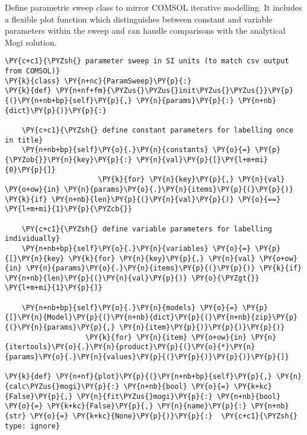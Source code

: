 Define parametric sweep class to mirror COMSOL iterative modelling. It
includes a flexible plot function which distinguishes between constant
and variable parameters within the sweep and can handle comparisons with
the analytical Mogi solution.

\begin{tcolorbox}[breakable, size=fbox, boxrule=1pt, pad at break*=1mm,colback=cellbackground, colframe=cellborder]
\begin{Verbatim}[commandchars=\\\{\}]
\PY{c+c1}{\PYZsh{} parameter sweep in SI units (to match csv output from COMSOL)}
\PY{k}{class} \PY{n+nc}{ParamSweep}\PY{p}{:}
\PY{k}{def} \PY{n+nf+fm}{\PYZus{}\PYZus{}init\PYZus{}\PYZus{}}\PY{p}{(}\PY{n+nb+bp}{self}\PY{p}{,} \PY{n}{params}\PY{p}{:} \PY{n+nb}{dict}\PY{p}{)}\PY{p}{:}

    \PY{c+c1}{\PYZsh{} define constant parameters for labelling once in title}
    \PY{n+nb+bp}{self}\PY{o}{.}\PY{n}{constants} \PY{o}{=} \PY{p}{\PYZob{}}\PY{n}{key}\PY{p}{:} \PY{n}{val}\PY{p}{[}\PY{l+m+mi}{0}\PY{p}{]}
                      \PY{k}{for} \PY{n}{key}\PY{p}{,} \PY{n}{val} \PY{o+ow}{in} \PY{n}{params}\PY{o}{.}\PY{n}{items}\PY{p}{(}\PY{p}{)} \PY{k}{if} \PY{n+nb}{len}\PY{p}{(}\PY{n}{val}\PY{p}{)} \PY{o}{==} \PY{l+m+mi}{1}\PY{p}{\PYZcb{}}

    \PY{c+c1}{\PYZsh{} define variable parameters for labelling individually}
    \PY{n+nb+bp}{self}\PY{o}{.}\PY{n}{variables} \PY{o}{=} \PY{p}{[}\PY{n}{key} \PY{k}{for} \PY{n}{key}\PY{p}{,} \PY{n}{val} \PY{o+ow}{in} \PY{n}{params}\PY{o}{.}\PY{n}{items}\PY{p}{(}\PY{p}{)} \PY{k}{if} \PY{n+nb}{len}\PY{p}{(}\PY{n}{val}\PY{p}{)} \PY{o}{\PYZgt{}} \PY{l+m+mi}{1}\PY{p}{]}

    \PY{n+nb+bp}{self}\PY{o}{.}\PY{n}{models} \PY{o}{=} \PY{p}{[}\PY{n}{Model}\PY{p}{(}\PY{n+nb}{dict}\PY{p}{(}\PY{n+nb}{zip}\PY{p}{(}\PY{n}{params}\PY{p}{,} \PY{n}{item}\PY{p}{)}\PY{p}{)}\PY{p}{)}
                   \PY{k}{for} \PY{n}{item} \PY{o+ow}{in} \PY{n}{itertools}\PY{o}{.}\PY{n}{product}\PY{p}{(}\PY{o}{*}\PY{n}{params}\PY{o}{.}\PY{n}{values}\PY{p}{(}\PY{p}{)}\PY{p}{)}\PY{p}{]}

\PY{k}{def} \PY{n+nf}{plot}\PY{p}{(}\PY{n+nb+bp}{self}\PY{p}{,} \PY{n}{calc\PYZus{}mogi}\PY{p}{:} \PY{n+nb}{bool} \PY{o}{=} \PY{k+kc}{False}\PY{p}{,} \PY{n}{fit\PYZus{}mogi}\PY{p}{:} \PY{n+nb}{bool} \PY{o}{=} \PY{k+kc}{False}\PY{p}{,} \PY{n}{name}\PY{p}{:} \PY{n+nb}{str} \PY{o}{=} \PY{k+kc}{None}\PY{p}{)}\PY{p}{:}  \PY{c+c1}{\PYZsh{} type: ignore}


\end{Verbatim}
\end{tcolorbox}
